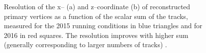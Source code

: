 \begin{figure}
\begin{center}
\end{center}
\caption{Resolution of the x-- (a) and z--coordinate  (b)
of reconstructed primary vertices
as a function of the scalar sum \pT of the tracks, 
measured for the 2015 running conditions in blue triangles
and for 2016 in red squares.
The resolution improves
with higher sum \pT (generally corresponding to larger numbers of tracks) \cite{cms-trk-dp}.}
\label{fig:objects_tracks_pvres}
\end{figure}


